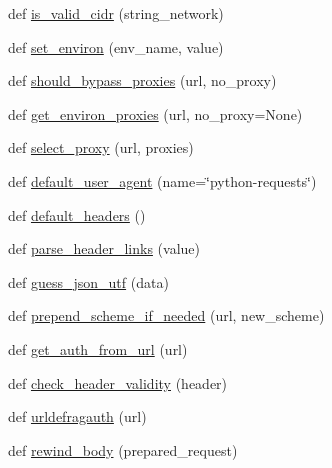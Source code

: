 \begin{DoxyCompactItemize}
\item 
def \hyperlink{namespacepip_1_1__vendor_1_1requests_1_1utils_ad38f3573380d0eac761fb6fd62fd1ee6}{is\+\_\+valid\+\_\+cidr} (string\+\_\+network)
\item 
def \hyperlink{namespacepip_1_1__vendor_1_1requests_1_1utils_a9684ad18e669b3368bcbb35ad6ce1c43}{set\+\_\+environ} (env\+\_\+name, value)
\item 
def \hyperlink{namespacepip_1_1__vendor_1_1requests_1_1utils_a962119fb89cc1cee022c8898e5144378}{should\+\_\+bypass\+\_\+proxies} (url, no\+\_\+proxy)
\item 
def \hyperlink{namespacepip_1_1__vendor_1_1requests_1_1utils_a5263fd4ed9263e77ee4cdd19818a06a3}{get\+\_\+environ\+\_\+proxies} (url, no\+\_\+proxy=None)
\item 
def \hyperlink{namespacepip_1_1__vendor_1_1requests_1_1utils_aa03c8dfaf6051455dc70bac3e146011b}{select\+\_\+proxy} (url, proxies)
\item 
def \hyperlink{namespacepip_1_1__vendor_1_1requests_1_1utils_a861ce532eca7c79b5b166cd84e1f4457}{default\+\_\+user\+\_\+agent} (name=\char`\"{}python-\/requests\char`\"{})
\item 
def \hyperlink{namespacepip_1_1__vendor_1_1requests_1_1utils_aba441f14b273f58f3929c9b857a4a17a}{default\+\_\+headers} ()
\item 
def \hyperlink{namespacepip_1_1__vendor_1_1requests_1_1utils_acf7d1a84c806272380c57f2641aea88c}{parse\+\_\+header\+\_\+links} (value)
\item 
def \hyperlink{namespacepip_1_1__vendor_1_1requests_1_1utils_ad0ec9949532e3b4c63c9db5b26da10de}{guess\+\_\+json\+\_\+utf} (data)
\item 
def \hyperlink{namespacepip_1_1__vendor_1_1requests_1_1utils_a139f55ace86e6b8e5dc542d2827e9b08}{prepend\+\_\+scheme\+\_\+if\+\_\+needed} (url, new\+\_\+scheme)
\item 
def \hyperlink{namespacepip_1_1__vendor_1_1requests_1_1utils_ab318ccc9d0bd3fcf05005c165a178ae2}{get\+\_\+auth\+\_\+from\+\_\+url} (url)
\item 
def \hyperlink{namespacepip_1_1__vendor_1_1requests_1_1utils_a387e49b8bb8e3d938dff6565881518b7}{check\+\_\+header\+\_\+validity} (header)
\item 
def \hyperlink{namespacepip_1_1__vendor_1_1requests_1_1utils_a9b2af719c0a6b1b5f16efff0e7884cfc}{urldefragauth} (url)
\item 
def \hyperlink{namespacepip_1_1__vendor_1_1requests_1_1utils_a3b7a9fdbcc3bff367a32f4b1f399a9bc}{rewind\+\_\+body} (prepared\+\_\+request)
\end{DoxyCompactItemize}
